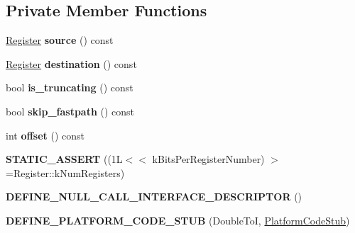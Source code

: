 \subsection*{Private Member Functions}
\begin{DoxyCompactItemize}
\item 
\hyperlink{structv8_1_1internal_1_1_register}{Register} {\bfseries source} () const \hypertarget{classv8_1_1internal_1_1_double_to_i_stub_a8390acea982465a410a940d5e83800f6}{}\label{classv8_1_1internal_1_1_double_to_i_stub_a8390acea982465a410a940d5e83800f6}

\item 
\hyperlink{structv8_1_1internal_1_1_register}{Register} {\bfseries destination} () const \hypertarget{classv8_1_1internal_1_1_double_to_i_stub_ab8b7b29f39f32fdc26bfaf3ea7288e6e}{}\label{classv8_1_1internal_1_1_double_to_i_stub_ab8b7b29f39f32fdc26bfaf3ea7288e6e}

\item 
bool {\bfseries is\+\_\+truncating} () const \hypertarget{classv8_1_1internal_1_1_double_to_i_stub_a12e21fafc97cbadc10c2010da3528947}{}\label{classv8_1_1internal_1_1_double_to_i_stub_a12e21fafc97cbadc10c2010da3528947}

\item 
bool {\bfseries skip\+\_\+fastpath} () const \hypertarget{classv8_1_1internal_1_1_double_to_i_stub_a4c812ff97daf0a7ab86fdaf88c4f2c34}{}\label{classv8_1_1internal_1_1_double_to_i_stub_a4c812ff97daf0a7ab86fdaf88c4f2c34}

\item 
int {\bfseries offset} () const \hypertarget{classv8_1_1internal_1_1_double_to_i_stub_a42af52da01e9344d72635a337f57c681}{}\label{classv8_1_1internal_1_1_double_to_i_stub_a42af52da01e9344d72635a337f57c681}

\item 
{\bfseries S\+T\+A\+T\+I\+C\+\_\+\+A\+S\+S\+E\+RT} ((1\+L$<$$<$ k\+Bits\+Per\+Register\+Number) $>$=\+Register\+::k\+Num\+Registers)\hypertarget{classv8_1_1internal_1_1_double_to_i_stub_aa31e5ea4e6acf50a9d6c262548061b4c}{}\label{classv8_1_1internal_1_1_double_to_i_stub_aa31e5ea4e6acf50a9d6c262548061b4c}

\item 
{\bfseries D\+E\+F\+I\+N\+E\+\_\+\+N\+U\+L\+L\+\_\+\+C\+A\+L\+L\+\_\+\+I\+N\+T\+E\+R\+F\+A\+C\+E\+\_\+\+D\+E\+S\+C\+R\+I\+P\+T\+OR} ()\hypertarget{classv8_1_1internal_1_1_double_to_i_stub_ace681fe772d7bd96a7ef624b1466cb30}{}\label{classv8_1_1internal_1_1_double_to_i_stub_ace681fe772d7bd96a7ef624b1466cb30}

\item 
{\bfseries D\+E\+F\+I\+N\+E\+\_\+\+P\+L\+A\+T\+F\+O\+R\+M\+\_\+\+C\+O\+D\+E\+\_\+\+S\+T\+UB} (Double\+ToI, \hyperlink{classv8_1_1internal_1_1_platform_code_stub}{Platform\+Code\+Stub})\hypertarget{classv8_1_1internal_1_1_double_to_i_stub_a38f712da751afdd339c5d636b8496cdb}{}\label{classv8_1_1internal_1_1_double_to_i_stub_a38f712da751afdd339c5d636b8496cdb}

\end{DoxyCompactItemize}
